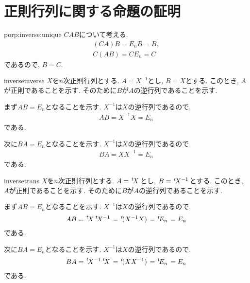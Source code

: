 

\section{正則行列に関する命題の証明}
\begin{proofof}{porp:inverse:unique}
  $CAB$について考える.
  \begin{align*}
    (CA)B=E_nB=B,\\
    C(AB)=CE_n=C
  \end{align*}
  であるので, $B=C$.
\end{proofof}


\begin{proofof*}{inverse}{inverse}
  $X$を$n$次正則行列とする.
  $A=X^{-1}$とし,
  $B=X$とする.
  このとき, $A$が正則であることを示す.
  そのために$B$が$A$の逆行列であることを示す.

  まず$AB=E_n$となることを示す.
  $X^{-1}$は$X$の逆行列であるので,
  \begin{align*}
    AB=X^{-1}X=E_n
  \end{align*}
  である.

  次に$BA=E_n$となることを示す.
  $X^{-1}$は$X$の逆行列であるので,
  \begin{align*}
    BA=XX^{-1}=E_n
  \end{align*}
  である.
\end{proofof*}

\begin{proofof*}{inverse}{trans}
  $X$を$n$次正則行列とする.
  $A={\left.^{t}\!X\right.}$とし,
  $B={\left.^{t}\!X^{-1}\right.}$とする.
  このとき, $A$が正則であることを示す.
  そのために$B$が$A$の逆行列であることを示す.

  まず$AB=E_n$となることを示す.
  $X^{-1}$は$X$の逆行列であるので,
  \begin{align*}
    AB={\left.^{t}\!X\right.}{\left.^{t}\!X^{-1}\right.}={\left.^{t}\!(X^{-1}X)\right.}={\left.^{t}\!E_n\right.}=E_n
  \end{align*}
  である.

  次に$BA=E_n$となることを示す.
  $X^{-1}$は$X$の逆行列であるので,
  \begin{align*}
    BA={\left.^{t}\!X^{-1}\right.}{\left.^{t}\!X\right.}={\left.^{t}\!(XX^{-1})\right.}={\left.^{t}\!E_n\right.}=E_n
  \end{align*}
  である.
\end{proofof*}



